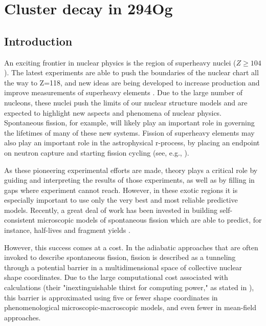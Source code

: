 \chapter{Cluster decay in 294Og}\label{chap:294Og}

\maketitle
\section{\label{sec:introduction}Introduction}

An exciting frontier in nuclear physics is the region of superheavy nuclei ($Z\geq104$). The latest experiments are able to push the boundaries of the nuclear chart all the way to Z=118, and new ideas are being developed to increase production and improve measurements of superheavy elements \cite{Dmitriev2016,Oganessian2016}. Due to the large number of nucleons, these nuclei push the limits of our nuclear structure models and are expected to highlight new aspects and phenomena of nuclear physics. Spontaneous fission, for example, will likely play an important role in governing the lifetimes of many of these new systems. Fission of superheavy elements may also play an important role in the astrophysical r-process, by placing an endpoint on neutron capture and starting fission cycling (see, e.g., \cite{Giuliani2017}).

As these pioneering experimental efforts are made, theory plays a critical role by guiding and interpreting the results of those experiments, as well as by filling in gaps where experiment cannot reach. However, in these exotic regions it is especially important to use only the very best and most reliable predictive models. Recently, a great deal of work has been invested in building self-consistent microscopic models of spontaneous fission which are able to predict, for instance, half-lives and fragment yields \cite{Sadhukhan2013,Sadhukhan2014,Sadhukhan2016,Sadhukhan2017}.

However, this success comes at a cost. In the adiabatic approaches that are often invoked to describe spontaneous fission, fission is described as a tunneling through a potential barrier in a multidimensional space of collective nuclear shape coordinates. Due to the large computational cost associated with calculations (their "inextinguishable thirst for computing power," as stated in \cite{Schunck2016}), this barrier is approximated using five or fewer shape coordinates in phenomenological microscopic-macroscopic models, and even fewer in mean-field approaches.

